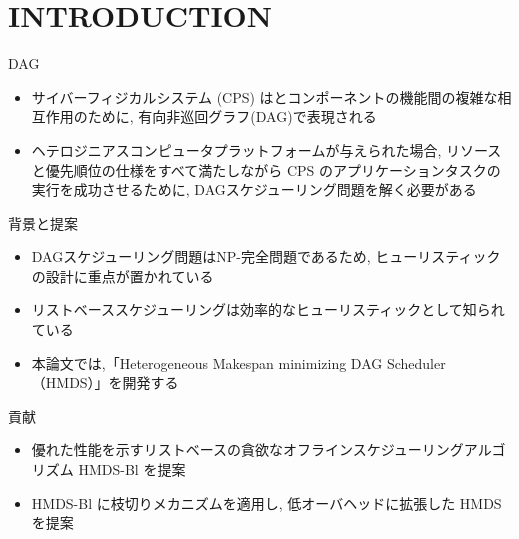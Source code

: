 
\section{INTRODUCTION}
\label{sec: introduction}

\begin{frame}{DAG}
    \begin{itemize}
        \item サイバーフィジカルシステム (CPS) はとコンポーネントの機能間の複雑な相互作用のために, 有向非巡回グラフ(DAG)で表現される
        \item ヘテロジニアスコンピュータプラットフォームが与えられた場合, リソースと優先順位の仕様をすべて満たしながら CPS のアプリケーションタスクの実行を成功させるために, DAGスケジューリング問題を解く必要がある
    \end{itemize}
\end{frame}

\begin{frame}{背景と提案}
    \begin{itemize}
        \item DAGスケジューリング問題はNP-完全問題であるため, ヒューリスティックの設計に重点が置かれている
        \item リストベーススケジューリングは効率的なヒューリスティックとして知られている
        \item 本論文では,「Heterogeneous Makespan minimizing DAG Scheduler（HMDS）」を開発する
    \end{itemize}
\end{frame}

\begin{frame}{貢献}
    \begin{itemize}
        \item 優れた性能を示すリストベースの貪欲なオフラインスケジューリングアルゴリズム HMDS-Bl を提案
        \item HMDS-Bl に枝切りメカニズムを適用し, 低オーバヘッドに拡張した HMDS を提案
    \end{itemize}
\end{frame}
